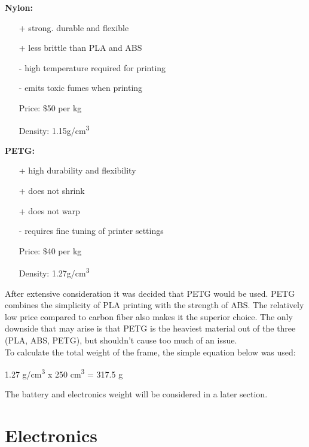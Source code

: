 \documentclass[12pt]{article}
\begin{document}
\textbf{Nylon:}
\renewcommand{\labelitemi}{\textperiodcentered}
\begin{itemize}
\item[+] strong. durable and flexible
\item[+] less brittle than PLA and ABS
\item[-] high temperature required for printing
\item[-] emits toxic fumes when printing
\item[Price:] \$50 per kg
\item[Density:] 1.15g/cm\textsuperscript{3}
\end{itemize}
\vspace{5mm}

\textbf{PETG:}
\renewcommand{\labelitemi}{\textperiodcentered}
\begin{itemize}
\item[+] high durability and flexibility
\item[+] does not shrink
\item[+] does not warp
\item[-] requires fine tuning of printer settings
\item[Price:] \$40 per kg
\item[Density:] 1.27g/cm\textsuperscript{3}
\end{itemize}

After extensive consideration it was decided that PETG would be used. PETG combines the simplicity of PLA printing with the strength of ABS. The relatively low price compared to carbon fiber also makes it the superior choice. The only downside that may arise is that PETG is the heaviest material out of the three (PLA, ABS, PETG), but shouldn't cause too much of an issue. 
\\

To calculate the total weight of the frame, the simple equation below was used:
\\

\centerline{1.27 g/cm\textsuperscript{3} x 250 cm\textsuperscript{3} = 317.5 g}
\vspace{5mm}
The battery and electronics weight will be considered in a later section.


\section{Electronics}
\end{document}
